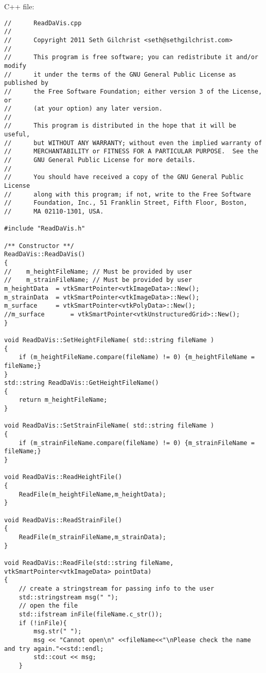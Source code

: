 C++ file:
\begin{lstlisting}
//      ReadDaVis.cpp
//
//      Copyright 2011 Seth Gilchrist <seth@sethgilchrist.com>
//
//      This program is free software; you can redistribute it and/or modify
//      it under the terms of the GNU General Public License as published by
//      the Free Software Foundation; either version 3 of the License, or
//      (at your option) any later version.
//
//      This program is distributed in the hope that it will be useful,
//      but WITHOUT ANY WARRANTY; without even the implied warranty of
//      MERCHANTABILITY or FITNESS FOR A PARTICULAR PURPOSE.  See the
//      GNU General Public License for more details.
//
//      You should have received a copy of the GNU General Public License
//      along with this program; if not, write to the Free Software
//      Foundation, Inc., 51 Franklin Street, Fifth Floor, Boston,
//      MA 02110-1301, USA.

#include "ReadDaVis.h"

/** Constructor **/
ReadDaVis::ReadDaVis()
{
//    m_heightFileName; // Must be provided by user
//    m_strainFileName; // Must be provided by user
m_heightData  = vtkSmartPointer<vtkImageData>::New();
m_strainData  = vtkSmartPointer<vtkImageData>::New();
m_surface     = vtkSmartPointer<vtkPolyData>::New();
//m_surface       = vtkSmartPointer<vtkUnstructuredGrid>::New();
}

void ReadDaVis::SetHeightFileName( std::string fileName )
{
    if (m_heightFileName.compare(fileName) != 0) {m_heightFileName = fileName;}
}
std::string ReadDaVis::GetHeightFileName()
{
    return m_heightFileName;
}

void ReadDaVis::SetStrainFileName( std::string fileName )
{
    if (m_strainFileName.compare(fileName) != 0) {m_strainFileName = fileName;}
}

void ReadDaVis::ReadHeightFile()
{
    ReadFile(m_heightFileName,m_heightData);
}

void ReadDaVis::ReadStrainFile()
{
    ReadFile(m_strainFileName,m_strainData);
}

void ReadDaVis::ReadFile(std::string fileName, vtkSmartPointer<vtkImageData> pointData)
{
    // create a stringstream for passing info to the user
    std::stringstream msg(" ");
    // open the file
    std::ifstream inFile(fileName.c_str());
    if (!inFile){
        msg.str(" ");
        msg << "Cannot open\n" <<fileName<<"\nPlease check the name and try again."<<std::endl;
        std::cout << msg;
    }


\end{lstlisting}
